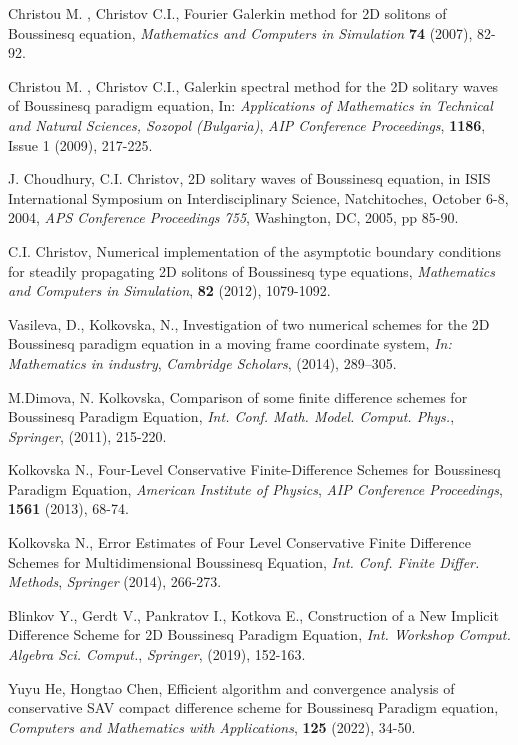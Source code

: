 \documentclass[a5paper]{article}
\theoremstyle{remark}
\begin{document}
\begin{normalsize}
\begin{thebibliography}{99}
	 Christou M. , Christov C.I.,
Fourier Galerkin method for 2D solitons of Boussinesq equation,
{\it Mathematics and Computers in Simulation} \textbf{74} (2007), 82-92.

	 Christou M. , Christov C.I.,
Galerkin spectral method for the 2D solitary waves of Boussinesq paradigm equation,
In: {\it Applications of Mathematics in Technical and Natural Sciences, Sozopol (Bulgaria)},
\emph{AIP Conference Proceedings}, \textbf{1186}, Issue 1 (2009), 217-225.

	 J. Choudhury, C.I. Christov,
2D solitary waves of Boussinesq equation, in ISIS International Symposium on Interdisciplinary Science, Natchitoches, October 6-8, 2004, {\it APS Conference Proceedings 755}, Washington, DC, 2005, pp 85-90.

	 C.I. Christov,
Numerical implementation of the asymptotic boundary conditions for steadily propagating 2D solitons of Boussinesq type equations,
{\it Mathematics and Computers in Simulation}, \textbf{82} (2012), 1079-1092.

	 Vasileva, D., Kolkovska, N., Investigation of two numerical schemes for the 2D Boussinesq paradigm equation in a moving frame coordinate system, {\it In: Mathematics in industry},
\emph{Cambridge Scholars}, (2014), 289–305.

	 M.Dimova, N. Kolkovska, Comparison of some finite difference schemes for Boussinesq Paradigm Equation, 
{\it Int. Conf. Math. Model. Comput. Phys.}, \emph{Springer}, (2011), 215-220.

	 Kolkovska N., Four-Level Conservative Finite-Difference Schemes for Boussinesq Paradigm Equation, {\it American Institute of Physics},
\emph{AIP Conference Proceedings}, \textbf{1561} (2013), 68-74.

	 Kolkovska N., Error Estimates of Four Level Conservative Finite Difference Schemes for Multidimensional Boussinesq  Equation,  {\it Int. Conf. Finite Differ. Methods}, \emph{Springer} (2014), 266-273.

	 Blinkov Y., Gerdt V., Pankratov I., Kotkova E., Construction of a New Implicit Difference Scheme for 2D Boussinesq Paradigm Equation, {\it Int. Workshop Comput. Algebra Sci. Comput.}, \emph{Springer}, (2019), 152-163.

	 Yuyu He, Hongtao Chen, Efficient algorithm and convergence analysis of conservative SAV compact difference scheme for Boussinesq Paradigm equation, 
{\it Computers and Mathematics with Applications}, \textbf{125} (2022), 34-50.


\end{thebibliography}
\end{normalsize}
\end{document}
